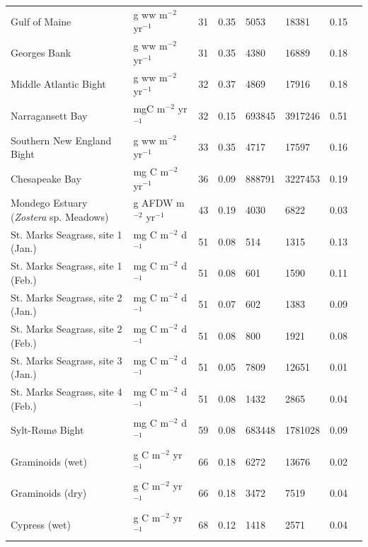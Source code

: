 \documentclass[article]{jss}
\begin{document}
\begin{table}[ht]
\begin{center}
\begin{tiny}
\begin{tabularx}{\textwidth}{llllllll}
      Gulf of Maine & g ww m$^{-2}$ yr$^{-1}$  &  31 & 0.35 & 5053 & 18381 & 0.15 &   \citet{link08} \\
      Georges Bank & g ww m$^{-2}$ yr$^{-1}$  &  31 & 0.35 & 4380 & 16889 & 0.18 &  \citet{link08} \\
      Middle Atlantic Bight & g ww m$^{-2}$ yr$^{-1}$  &  32 & 0.37 & 4869 & 17916 & 0.18 &  \citet{link08} \\
      Narragansett Bay & mgC m$^{-2}$ yr$^{-1}$  &  32 & 0.15 & 693845 & 3917246 & 0.51 &  \citet{monaco97} \\
      Southern New England Bight & g ww m$^{-2}$ yr$^{-1}$  &  33 & 0.35 & 4717 & 17597 & 0.16 &  \citet{link08} \\
      Chesapeake Bay  & mg C m$^{-2}$ yr$^{-1}$  &  36 & 0.09 & 888791 & 3227453 & 0.19 &  \citet{baird89} \\
      Mondego Estuary (\textit{Zostera} sp. Meadows) & g AFDW m$^{−2}$ yr$^{−1}$ &  43 & 0.19 & 4030 & 6822 & 0.03 & \citet{patricio2006mass} \\
      St. Marks Seagrass, site 1 (Jan.) & mg C m$^{-2}$ d$^{-1}$  &  51 & 0.08 & 514 & 1315 & 0.13 &  \citet{baird98} \\
      St. Marks Seagrass, site 1 (Feb.) & mg C m$^{-2}$ d$^{-1}$  &  51 & 0.08 & 601 & 1590 & 0.11 &  \citet{baird98} \\
      St. Marks Seagrass, site 2 (Jan.) & mg C m$^{-2}$ d$^{-1}$  &  51 & 0.07 & 602 & 1383 & 0.09 &  \citet{baird98} \\
      St. Marks Seagrass, site 2 (Feb.) & mg C m$^{-2}$ d$^{-1}$  &  51 & 0.08 & 800 & 1921 & 0.08 &  \citet{baird98} \\
      St. Marks Seagrass, site 3 (Jan.) & mg C m$^{-2}$ d$^{-1}$  &  51 & 0.05 & 7809 & 12651 & 0.01 & \citet{baird98} \\
      St. Marks Seagrass, site 4 (Feb.) & mg C m$^{-2}$ d$^{-1}$  &  51 & 0.08 & 1432 & 2865 & 0.04 &  \citet{baird98} \\
      Sylt-R{\o}m{\o} Bight & mg C m$^{-2}$ d$^{-1}$  &  59 & 0.08 & 683448 & 1781028 & 0.09 &  \citet{baird04_sylt} \\
      Graminoids (wet) & g C m$^{-2}$ yr$^{-1}$  &  66 & 0.18 & 6272 & 13676 & 0.02 &  \citet{ulanowicz00_graminoids} \\
      Graminoids (dry) & g C m$^{-2}$ yr$^{-1}$  &  66 & 0.18 & 3472 & 7519 & 0.04 &   \citet{ulanowicz00_graminoids} \\
      Cypress (wet) & g C m$^{-2}$ yr$^{-1}$  &  68 & 0.12 & 1418 & 2571 & 0.04 &  \citet{ulanowicz97_cypress} \\

\end{tabularx}
\end{tiny}
\end{center}
\end{table}
\end{document}
